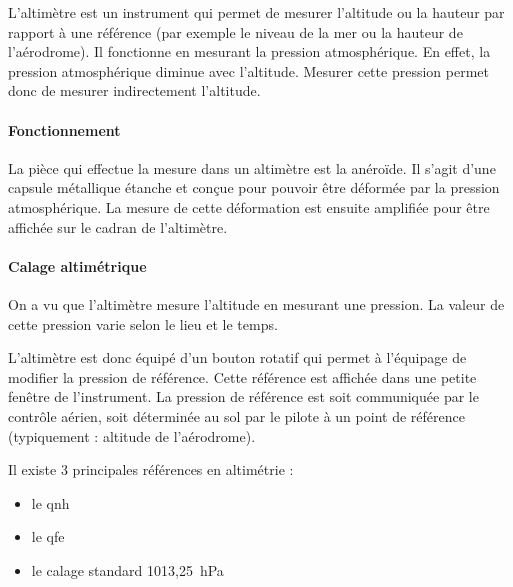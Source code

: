 	L'\gls{altimètre} est un instrument qui permet de mesurer l'altitude ou la hauteur par rapport à une référence (par exemple le niveau de la mer ou la hauteur de l'aérodrome). Il fonctionne en mesurant la pression atmosphérique. En effet, la pression atmosphérique diminue avec l'altitude. Mesurer cette pression permet donc de mesurer indirectement l'altitude. \\
	
	\begin{figure}[H]	
	\centering
	\end{figure}
	
	\paragraph{Fonctionnement} La pièce qui effectue la mesure dans un altimètre est la \gls{anéroïde}. Il s'agit d'une capsule métallique étanche et conçue pour pouvoir être déformée par la pression atmosphérique. La mesure de cette déformation est ensuite amplifiée pour être affichée sur le cadran de l'altimètre.
	
	\paragraph{Calage altimétrique}
	On a vu que l'altimètre mesure l'altitude en mesurant une pression. La valeur de cette pression varie selon le lieu et le temps. 
	
	L'altimètre est donc équipé d'un bouton rotatif qui permet à l'équipage de modifier la pression de référence. Cette référence est affichée dans une petite fenêtre de l'instrument. La pression de référence est soit communiquée par le contrôle aérien, soit déterminée au sol par le pilote à un point de référence (typiquement : altitude de l'aérodrome).
	
	
	Il existe 3 principales références en altimétrie :
	\begin{itemize}
		\item le \acrshort{qnh}
		\item le \acrshort{qfe}
		\item le calage standard 1013,25~hPa
	\end{itemize}
	
